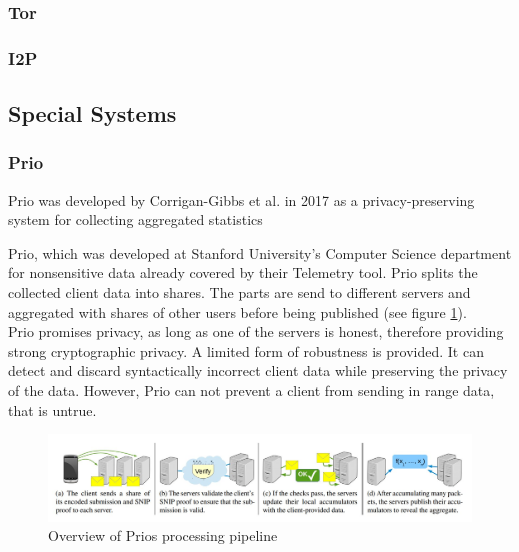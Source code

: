 \subsubsection{Tor}

\subsubsection{I2P}

%
%
\subsection{Special Systems}
\label{subsec:related:special}
%
\subsubsection{Prio}
    Prio was developed by Corrigan-Gibbs et al.\cite{corrigan-gibbs_prio_2017} in 2017 as a privacy-preserving
    system for collecting aggregated statistics
    
    Prio\cite{corrigan-gibbs_prio_2017}, which was developed at Stanford University's Computer Science department for nonsensitive data already covered by their Telemetry tool. 
    Prio splits the collected client data into shares. 
    The parts are send to different servers and aggregated with shares of other users before being published (see figure \ref{fig:prio_overview})\cite{corrigan-gibbs_prio_2017}.\\
    Prio promises privacy, as long as one of the servers is honest, therefore providing strong cryptographic privacy. A limited form of robustness is provided. It can detect and discard
    syntactically incorrect client data while preserving the privacy of the data. However, Prio can not
    prevent a client from sending in range data, that is untrue.
    
    \begin{figure}
        \centering
        \includegraphics[width=\textwidth]{latex/figures/prio_overview.jpg}
        \caption{Overview of Prios processing pipeline\cite{corrigan-gibbs_prio_2017}}
        \label{fig:prio_overview}
    \end{figure}
    
